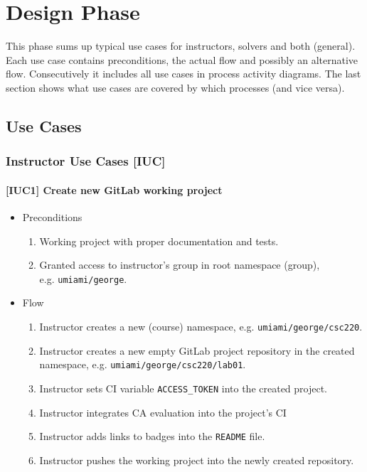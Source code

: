 \chapter{Design Phase} \label{chap:design}

{This phase sums up typical use cases for instructors, solvers and both (general). Each use case contains preconditions, the actual flow and possibly an alternative flow. Consecutively it includes all use cases in process activity diagrams. The last section shows what use cases are covered by which processes (and vice versa).}

\section{Use Cases} \label{sec:uc}

\subsection{{Instructor Use Cases {[}IUC{]}}} \label{ssec:iuc}

\subsubsection{{[}IUC1{]} Create new GitLab working project}

\begin{itemize}
\item
  {Preconditions}
    \begin{enumerate}
    \item 
      {Working project with proper documentation and tests.}
    \item
      {Granted access to instructor's group in root namespace (group), \\ e.g. \texttt{umiami/george}.}
    \end{enumerate}
\end{itemize}

\begin{itemize}
\item
  {Flow}
    \begin{enumerate}
    \item
      {Instructor creates a new (course) namespace, e.g. \texttt{umiami/george/csc220}.}
    \item
      {Instructor creates a new empty GitLab project repository in the created namespace, e.g. \texttt{umiami/george/csc220/lab01}.}
    \item
      {Instructor sets CI variable \texttt{ACCESS\_TOKEN} into the created project.}
    \item
      {Instructor integrates CA evaluation into the project's CI}
    \item
      {Instructor adds links to badges into the \texttt{README} file.}
    \item
      {Instructor pushes the working project into the newly created repository.}
    \end{enumerate}
\end{itemize}

